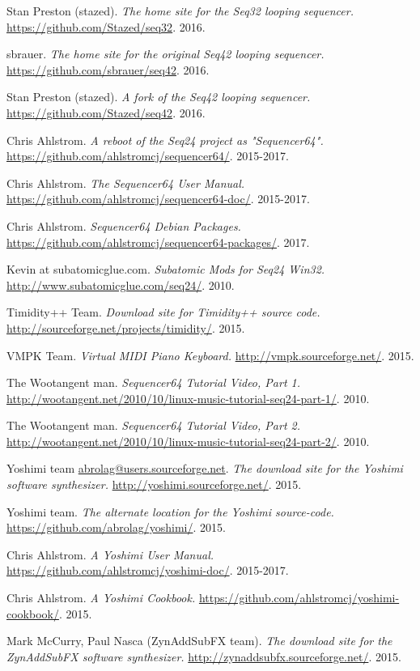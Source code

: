 \begin{thebibliography}{99}
   Stan Preston (stazed).
   \emph{The home site for the Seq32 looping sequencer.}
   \url{https://github.com/Stazed/seq32}.
   2016.

   sbrauer.
   \emph{The home site for the original Seq42 looping sequencer.}
   \url{https://github.com/sbrauer/seq42}.
   2016.

   Stan Preston (stazed).
   \emph{A fork of the Seq42 looping sequencer.}
   \url{https://github.com/Stazed/seq42}.
   2016.

   Chris Ahlstrom.
   \emph{A reboot of the Seq24 project as "Sequencer64".}
   \url{https://github.com/ahlstromcj/sequencer64/}.
   2015-2017.

   Chris Ahlstrom.
   \emph{The Sequencer64 User Manual.}
   \url{https://github.com/ahlstromcj/sequencer64-doc/}.
   2015-2017.

   Chris Ahlstrom.
   \emph{Sequencer64 Debian Packages.}
   \url{https://github.com/ahlstromcj/sequencer64-packages/}.
   2017.

   Kevin at subatomicglue.com.
   \emph{Subatomic Mods for Seq24 Win32.}
   \url{http://www.subatomicglue.com/seq24/}.
   2010.

   Timidity++ Team.
   \emph{Download site for Timidity++ source code.}
   \url{http://sourceforge.net/projects/timidity/}.
   2015.

   VMPK Team.
   \emph{Virtual MIDI Piano Keyboard.}
   \url{http://vmpk.sourceforge.net/}.
   2015.

   The Wootangent man.
   \emph{Sequencer64 Tutorial Video, Part 1.}
   \url{http://wootangent.net/2010/10/linux-music-tutorial-seq24-part-1/}.
   2010.

   The Wootangent man.
   \emph{Sequencer64 Tutorial Video, Part 2.}
   \url{http://wootangent.net/2010/10/linux-music-tutorial-seq24-part-2/}.
   2010.

   Yoshimi team \url{abrolag@users.sourceforge.net}.
   \emph{The download site for the Yoshimi software synthesizer.}
   \url{http://yoshimi.sourceforge.net/}.
   2015.

   Yoshimi team.
   \emph{The alternate location for the Yoshimi source-code.}
   \url{https://github.com/abrolag/yoshimi/}.
   2015.

   Chris Ahlstrom.
   \emph{A Yoshimi User Manual.}
   \url{https://github.com/ahlstromcj/yoshimi-doc/}.
   2015-2017.

   Chris Ahlstrom.
   \emph{A Yoshimi Cookbook.}
   \url{https://github.com/ahlstromcj/yoshimi-cookbook/}.
   2015.

   Mark McCurry, Paul Nasca (ZynAddSubFX team).
   \emph{The download site for the ZynAddSubFX software synthesizer.}
   \url{http://zynaddsubfx.sourceforge.net/}.
   2015.

\end{thebibliography}

